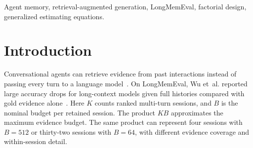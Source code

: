 \maketitle

\begin{abstract}
Conversational memory systems select sessions $K$ and a per-session context budget $B$. We derive an oracle ceiling on recovering every labeled evidence session in LongMemEval --- a dataset property before text truncation, not operating guidance. The smallest depth reaching 99.5\% coverage is $K^*=6$ on both cleaned scales, which share their evidence counts. At $K=1$, the ceiling is 100\% for single-session questions and 0\% for multi-session or knowledge-update questions. A protocol-specified crossed depth--budget GEE remains unexecuted. An exploratory Gemma-4-E4B-it pilot ran 18 conditions; 17 refusals triggered a coverage gate (single-reader NO-GO) that stopped advancement. Excluding 540 unanswerable trials and 16 answerable refusals left 8,444 trials; exact match was 6.71\%. The budget association was positive ($\hat\beta_B=0.3166$ log-odds, $p=2.46\times10^{-4}$) and the interaction inconclusive ($\hat\beta_{KB}=0.0111$, 95\% CI $[-0.0217,0.0439]$). Strict full-string exact match can reward longer outputs under larger budgets, so this exploratory, single-reader association cannot be attributed to evidence quality alone. Across 9,004 latency records the pooled 95th-percentile generation time was 15.72~s on a laptop GPU; the crossed $K\ge4$, $B=512$ tail was 26.15~s. Coverage, scoring, and latency must be measured together.
\end{abstract}

\begin{IEEEkeywords}
Agent memory, retrieval-augmented generation, LongMemEval, factorial design, generalized estimating equations.
\end{IEEEkeywords}

\section{Introduction}

Conversational agents can retrieve evidence from past interactions instead of passing every turn to a language model~\cite{lewis2020rag,packer2023memgpt}. On LongMemEval, Wu et~al. reported large accuracy drops for long-context models given full histories compared with gold evidence alone~\cite{wu2025longmemeval}. Here $K$ counts ranked multi-turn sessions, and $B$ is the nominal budget per retained session. The product $KB$ approximates the maximum evidence budget. The same product can represent four sessions with $B=512$ or thirty-two sessions with $B=64$, with different evidence coverage and within-session detail.

